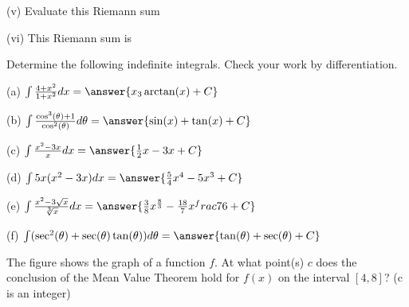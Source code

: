 \documentclass{ximera}
\begin{document}
\begin{exercise}
(v) Evaluate this Riemann sum
\begin{multipleChoice}
\end{multipleChoice}

(vi) This Riemann sum is
\begin{multipleChoice}
\end{multipleChoice}
\end{exercise}

\begin{exercise}
Determine the following indefinite integrals.  Check your work by differentiation.

(a) $\int\frac{4+x^2}{1+x^2}dx=\answer{x_3\arctan(x)+C}$

(b) $\int\frac{\cos^3(\theta)+1}{\cos^2(\theta)}d\theta=\answer{\sin(x)+\tan(x)+C}$

(c) $\int\frac{x^2-3x}{x}dx=\answer{\frac{1}{2}x-3x+C}$

(d) $\int 5x(x^2-3x)dx=\answer{\frac{5}{4}x^4-5x^3+C}$

(e) $\int\frac{x^2-3\sqrt{x}}{\sqrt[3]{x}}dx = \answer{\frac{3}{8}x^{\frac{8}{3}}-\frac{18}{7}x^frac{7}{6}+C}$

(f) $\int(\sec^2(\theta)+\sec(\theta)\tan(\theta))d\theta=\answer{\tan(\theta)+\sec(\theta)+C}$
\end{exercise}

\begin{exercise}
The figure shows the graph of a function $f$. At what point(s) $c$ does the conclusion of the Mean Value Theorem hold for $f(x)$ on the interval $[4,8]$? (c is an integer)

\begin{image}
\end{image}


\begin{selectAll}
\end{selectAll}
\end{exercise}
\end{document}
